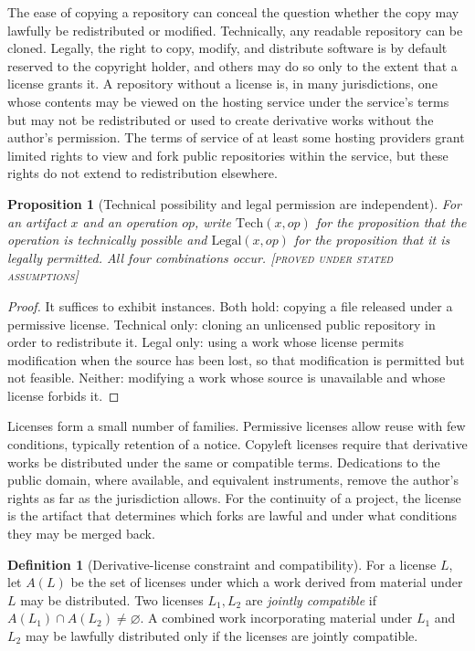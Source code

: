 \documentclass[11pt,twoside,openright]{book}
\theoremstyle{plain}
\newtheorem{proposition}[theorem]{Proposition}
\theoremstyle{definition}
\newtheorem{definition}[theorem]{Definition}
\theoremstyle{remark}
\newcommand{\Proved}{\textup{\textsc{[proved under stated assumptions]}}}
\begin{document}
The ease of copying a repository can conceal the question whether the copy may lawfully be redistributed or modified. Technically, any readable repository can be cloned. Legally, the right to copy, modify, and distribute software is by default reserved to the copyright holder, and others may do so only to the extent that a license grants it. A repository without a license is, in many jurisdictions, one whose contents may be viewed on the hosting service under the service's terms but may not be redistributed or used to create derivative works without the author's permission. The terms of service of at least some hosting providers grant limited rights to view and fork public repositories within the service, but these rights do not extend to redistribution elsewhere.

\begin{proposition}[Technical possibility and legal permission are independent]\label{prop:techlegal}
For an artifact $x$ and an operation $\mathit{op}$, write $\mathrm{Tech}(x,\mathit{op})$ for the proposition that the operation is technically possible and $\mathrm{Legal}(x,\mathit{op})$ for the proposition that it is legally permitted. All four combinations occur.
\Proved{}
\end{proposition}

\begin{proof}
It suffices to exhibit instances. Both hold: copying a file released under a permissive license. Technical only: cloning an unlicensed public repository in order to redistribute it. Legal only: using a work whose license permits modification when the source has been lost, so that modification is permitted but not feasible. Neither: modifying a work whose source is unavailable and whose license forbids it.
\end{proof}

Licenses form a small number of families. Permissive licenses allow reuse with few conditions, typically retention of a notice. Copyleft licenses require that derivative works be distributed under the same or compatible terms. Dedications to the public domain, where available, and equivalent instruments, remove the author's rights as far as the jurisdiction allows. For the continuity of a project, the license is the artifact that determines which forks are lawful and under what conditions they may be merged back.

\begin{definition}[Derivative-license constraint and compatibility]\label{def:licensecompat}
For a license $L$, let $A(L)$ be the set of licenses under which a work derived from material under $L$ may be distributed. Two licenses $L_1,L_2$ are \emph{jointly compatible} if $A(L_1)\cap A(L_2)\neq\varnothing$. A combined work incorporating material under $L_1$ and $L_2$ may be lawfully distributed only if the licenses are jointly compatible.
\end{definition}
\end{document}
